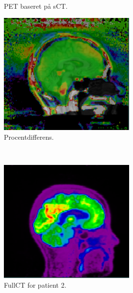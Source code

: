 \begin{figure}
\begin{subfigure}{0.3\textwidth}
        \caption{PET baseret på sCT.}
        \label{col:loocv_pet_pat1_sct}
    \end{subfigure}\hfill
    \begin{subfigure}{0.3\textwidth}
        \centering
        \includegraphics[width=0.75\textwidth]{colager/loocv_pet/loocv_010476_pet_pd.png}
        \caption{Procentdifferens.}
        \label{col:loocv_pet_pat1_pd}
    \end{subfigure}\\
    \begin{subfigure}{0.3\textwidth}
        \centering
        \includegraphics[width=0.75\textwidth]{colager/loocv_pet/loocv_010769_pet_ct.png}
        \caption{FullCT for patient 2.}
        \label{col:loocv_pet_pat2_ct}
    \end{subfigure}\hfill
    \begin{subfigure}{0.3\textwidth}

\end{subfigure}
\end{figure}
